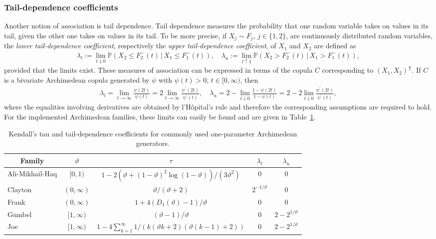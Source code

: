 \documentclass[nojss,article]{jss}
\theoremstyle{mythmstyle}
\newcommand*{\IP}{\mathbb{P}}
\newcommand*{\vt}{\vartheta}
\newcommand*{\psiD}{\psi^\prime}
\newcommand{\tr}{\ensuremath{^\mathsf{T}}}%
\begin{document}
\subsubsection{Tail-dependence coefficients}
Another notion of association is tail dependence. Tail dependence measures the
probability that one random variable takes on values in its tail, given the
other one takes on values in its tail. To be more precise, if $X_j\sim F_j$,
$j\in\{1,2\}$, are continuously distributed random variables, the
\textit{lower tail-dependence coefficient}, respectively the
\textit{upper tail-dependence coefficient}, of $X_1$ and $X_2$ are defined as
\begin{align*}
  \lambda_l:=\lim_{t\downarrow0}\IP(X_2\le F_2^-(t)\,\vert\,X_1\le  F_1^-(t)), \quad
  \lambda_u:=\lim_{t\uparrow1}  \IP(X_2 >  F_2^-(t)\,\vert\,X_1 > F_1^-(t)),
\end{align*}
provided that the limits exist. These measures of association can be
expressed in terms of the copula $C$ corresponding to $(X_1,X_2)\tr$. If $C$
is a bivariate Archimedean copula generated by $\psi$ with $\psi(t)>0$,
$t\in[0,\infty)$, then
\begin{align*}
  \lambda_l=\lim_{t\to\infty}\frac{\psi(2t)}{\psi(t)}        =  2\lim_{t\to\infty}\frac{\psiD(2t)}{\psiD(t)},
  \quad
  \lambda_u=2-\lim_{t\downarrow0}\frac{1-\psi(2t)}{1-\psi(t)} = 2-2\lim_{t\downarrow0}\frac{\psiD(2t)}{\psiD(t)},
\end{align*}
where the equalities involving derivatives are obtained by l'H\^opital's rule
and therefore the corresponding assumptions are required to hold. For the
implemented Archimedean families, these limits can easily be found and are
given in Table~\ref{table2}.
\begin{table}[htbp]
  \centering
  \begin{tabularx}{\textwidth}{@{\extracolsep{\fill}}Xcccc}
    \toprule
    \multicolumn{1}{c}{Family}&\multicolumn{1}{c}{$\vt$}&\multicolumn{1}{c}{$\tau$}&\multicolumn{1}{c}{$\lambda_l$}&\multicolumn{1}{c}{$\lambda_u$}\\
    \midrule
    Ali-Mikhail-Haq& $[0,1)$      &$1-2(\vt+(1-\vt)^2\log(1-\vt))/(3\vt^2)$ & 0 & 0\\
    Clayton        & $(0,\infty)$ &$\vt/(\vt+2)$		&$2^{-1/\vt}$ & 0\\
    Frank          & $(0,\infty)$ &$1+4(D_1(\vt)-1)/\vt$	& 0	& 0\\
    Gumbel         & $[1,\infty)$ &$(\vt-1)/\vt$		& 0	&$2-2^{1/\vt}$\\
    Joe            & $[1,\infty)$ &$1-4\sum_{k=1}^\infty 1/(k(\vt k+2)(\vt(k-1)+2))$
								& 0	&$2-2^{1/\vt}$\\
    \bottomrule
  \end{tabularx}
  \caption{Kendall's tau and tail-dependence coefficients for commonly used one-parameter Archimedean generators.}
  \label{table2}
\end{table}
\end{document}
